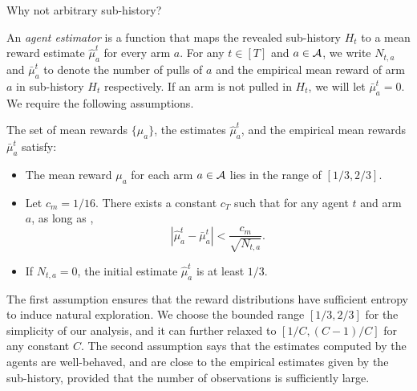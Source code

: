 \begin{remark}
  Why not arbitrary sub-history? 
\end{remark}

  An {\em agent estimator} is a function that maps the revealed sub-history $H_t$ to a mean reward estimate $\hat{\mu}_a^t$ for every arm $a$. For any $t\in[T]$ and $a\in \mathcal{A}$, we write $N_{t, a}$ and $\bar{\mu}_a^t$ to denote the number of pulls of $a$ and the empirical mean reward of arm $a$ in sub-history $H_t$ respectively. If an arm is not pulled in $H_t$, we will let $\bar{\mu}_a^t = 0$.  We require the following assumptions.

\begin{assumption}
	\label{ass:embehave}
	The set of mean rewards $\{\mu_a\}$, the estimates $\hat \mu_a^t$, and the empirical mean rewards $\bar\mu_a^t$  satisfy:
	
	\begin{itemize}
		\item The mean reward $\mu_a$ for each arm $a\in \mathcal{A}$ lies in the range
		of $[1/3, 2/3]$.
		
		
		\item Let $c_m = 1/16$. 
		There exists a constant $c_T$ such that for any agent $t$ and
		arm $a$, as long as , 
		\[
		\left|\hat{\mu}^t_a - \bar{\mu}^t_a \right| <
		\frac{c_m}{\sqrt{N_{t,a}}}.
		\]
		\item If $N_{t,a} = 0$, the initial estimate
		$\hat{\mu}^t_a$ is at least $1/3$.
	\end{itemize}
\end{assumption}

The first assumption ensures that the reward distributions have sufficient entropy to induce natural exploration. We choose the bounded range $[1/3, 2/3]$ for the simplicity of our analysis, and it can further relaxed to $[1/C, (C-1)/C]$ for any constant $C$. The second assumption says that the estimates computed by the agents are well-behaved, and are close to the empirical estimates given by the sub-history, provided that the number of observations is sufficiently large.

